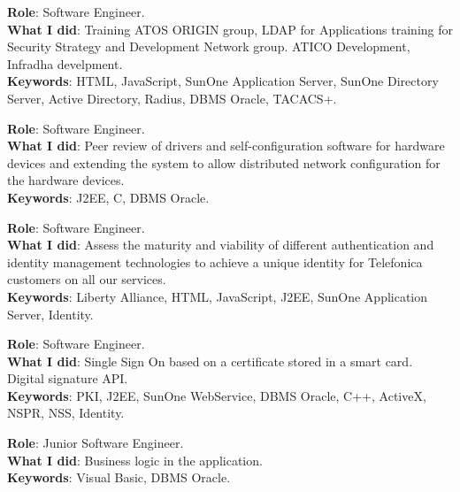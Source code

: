 \documentclass[]{resume}
\begin{document}
\begin{minipage}[t]{0.66\textwidth}

\textbf{Role}: Software Engineer.\\
\textbf{What I did}: Training ATOS ORIGIN group, LDAP for Applications training for Security Strategy and Development Network group. ATICO Development, Infradha develpment.\\
\textbf{Keywords}: HTML, JavaScript, SunOne Application Server, SunOne Directory Server, Active Directory, Radius, DBMS Oracle, TACACS+.
\sectionsep

\descript{|}
\textbf{Role}: Software Engineer.\\
\textbf{What I did}: Peer review of drivers and self-configuration software for hardware devices and extending the system to allow distributed network configuration for the hardware devices.\\
\textbf{Keywords}: J2EE, C, DBMS Oracle.
\sectionsep

\textbf{Role}: Software Engineer.\\
\textbf{What I did}: Assess the maturity and viability of different authentication and identity management technologies to achieve a unique identity for Telefonica customers on all our services.\\
\textbf{Keywords}: Liberty Alliance, HTML, JavaScript, J2EE, SunOne Application Server, Identity.
\sectionsep

\textbf{Role}: Software Engineer.\\
\textbf{What I did}: Single Sign On based on a certificate stored in a smart card. Digital signature API.\\
\textbf{Keywords}: PKI, J2EE, SunOne WebService, DBMS Oracle, C++, ActiveX, NSPR, NSS, Identity.
\sectionsep

\textbf{Role}: Junior Software Engineer.\\
\textbf{What I did}: Business logic in the application.\\
\textbf{Keywords}: Visual Basic, DBMS Oracle.
\sectionsep

\end{minipage}
\end{document}
